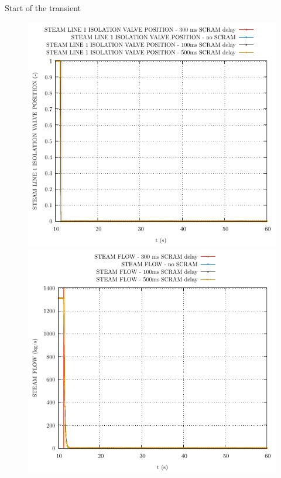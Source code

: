 \begin{frame}{Start of the transient}
	\begin{figure}
		\centering
		\begin{minipage}{.5\textwidth}
			\centering
			\includegraphics[width=0.7\linewidth]{./graphs/STEAM LINE 1 ISOLATION VALVE POSITION_comp.pdf}
		\end{minipage}%
		\begin{minipage}{.5\textwidth}
			\centering
			\includegraphics[width=.7\linewidth]{./graphs/STEAM FLOW_comp.pdf}
		\end{minipage}
	\end{figure}
	\vspace{-10pt}
	\begin{figure}
	\centering
	\begin{minipage}{.5\textwidth}
		\centering

\end{minipage}
\end{figure}
\end{frame}
